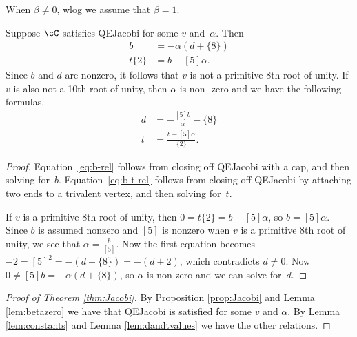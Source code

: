\documentclass[12pt]{amsart}
\begin{document}
When $\beta \neq 0$, wlog we assume that $\beta = 1$.

\begin{lemma} \label{lem:dandtvalues}
Suppose $\cC$ satisfies QEJacobi for some $v$ and~$\alpha$. Then 
\begin{align}
  [5] b &= - \alpha (d+\{8\})\label{eq:b-rel} \\
  t \{2\} &= b-[5] \alpha.\label{eq:b-t-rel}
\end{align}
Since $b$ and $d$ are nonzero, it follows that $v$ is not a primitive $8$th
root of unity.  If $v$ is also not a 10th root of unity, then $\alpha$ is non-
zero and we have the following formulas.
\begin{align*}
  d &= -\frac{[5] b}{\alpha} - \{8\}   \\
  t  &= \frac{b-[5] \alpha}{\{2\}}.
\end{align*}
\end{lemma}
\begin{proof}
Equation~\eqref{eq:b-rel} follows from closing off QEJacobi with a cap, and
then solving for~$b$. Equation~\eqref{eq:b-t-rel} follows from   closing off
QEJacobi by attaching two ends   to a trivalent vertex, and then solving
for~$t$.
  
If $v$ is a primitive $8$th root of unity, then $0 = t \{2\} = b-[5] \alpha$,
so $b = [5] \alpha$.  Since $b$ is assumed nonzero and $[5]$ is nonzero when
$v$ is a primitive $8$th root of unity, we see that $\alpha = \frac{b}{[5]}$.
Now the first equation becomes $-2 = [5]^2 = -(d+\{8\})=-(d+2)$, which
contradicts $d \neq 0$.   Now $0 \neq [5] b = - \alpha (d+\{8\})$, so $\alpha$
is non-zero and   we can solve for~$d$.
\end{proof}

\begin{proof}[Proof of Theorem \ref{thm:Jacobi}]
By Proposition \ref{prop:Jacobi} and Lemma \ref{lem:betazero} we have that
QEJacobi is satisfied for some $v$ and $\alpha$.  By Lemma \ref{lem:constants}
and Lemma \ref{lem:dandtvalues} we have the other relations.
\end{proof}
\end{document}
